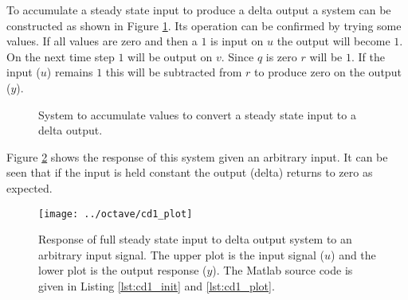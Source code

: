 \documentclass{article}
\begin{document}
To accumulate a steady state input to produce a delta output
a system can be constructed as shown in Figure \ref{fig:cd1}.
Its operation can be confirmed by trying some values.
If all values are zero and then a $1$ is input on $u$ the
output will become $1$.
On the next time step $1$ will be output on $v$.
Since $q$ is zero $r$ will be $1$.
If the input ($u$) remains $1$ this will be subtracted from $r$
to produce zero on the output ($y$).

\begin{figure}[hpb!]
\begin{center}


\end{center}

\caption{System to accumulate values to convert a steady state
input to a delta output.}
\label{fig:cd1}
\end{figure}


Figure \ref{fig:cd1_plot} shows the response of this system given
an arbitrary input.
It can be seen that if the input is held constant the output (delta)
returns to zero as expected.

\begin{figure}[htbp!]
\texttt{[image: ../octave/cd1\_plot]}
\caption{Response of full steady state input to delta output system
to an arbitrary input signal.
The upper plot is the input signal ($u$) and the lower plot is
the output response ($y$).
The Matlab source code is given in Listing \ref{lst:cd1_init}
and \ref{lst:cd1_plot}.
}
\label{fig:cd1_plot}
\end{figure}
\end{document}
